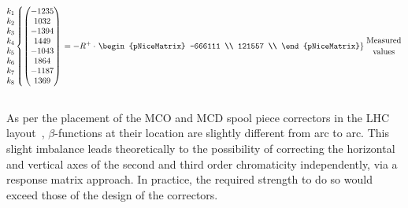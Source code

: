 \begin{equation}
    \begin{matrix}
      k_1 \\
      k_2 \\
      k_3 \\
      k_4 \\
      k_5 \\
      k_6 \\
      k_7 \\
      k_8 \\
    \end{matrix}
  \left\{
  \begin{pmatrix}
     -1235 \\
      1032   \\  
     -1394  \\ 
      1449   \\ 
     -1043  \\ 
      1864   \\ 
     -1187  \\ 
      1369   \\ 
  \end{pmatrix}
  \right.
  =
  -R^{+} 
  \cdot
  \left.
  \begin{pNiceMatrix}
      -666111 \\
      121557 \\
  \end{pNiceMatrix}
  \right\}
  {\genfrac{}{}{0pt}{0}{\text{Measured}}{\text{values}}}
  \label{eq:resp_matrix_inverse_example}
\end{equation}





\subsection{}
\label{subsection:correction_chromaticity}


As per the placement of the MCO and MCD spool piece correctors in the LHC 
layout~\cite{maclean_commissioning_2016-1}, $\beta$-functions at their location are slightly
different from arc to arc. This slight imbalance leads theoretically to the possibility of
correcting the horizontal and vertical axes of the second and third order chromaticity
independently, via a response matrix approach. In practice, the required strength to do so would
exceed those of the design of the correctors.


